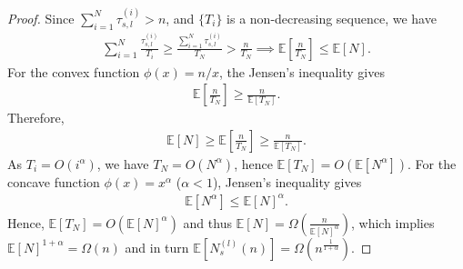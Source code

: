 \documentclass[twoside,11pt]{article}
\newcommand{\pow}[1]{^{(#1)}}%
\numberwithin{equation}{section}
\newcommand{\lp}{\left(}
\newcommand{\rp}{\right)}
\begin{document}
\begin{proof}
Since $\sum_{i=1}^N \tau_{s,l} \pow i > n$, and $\{T_i\}$ is a non-decreasing sequence, we have
\begin{align*}
\sum_{i=1}^N \frac{\tau_{s,l} \pow i}{T_i} \geq \frac{\sum_{i=1}^N \tau_{s,l} \pow i}{T_N} > \frac{n}{T_N} \implies \mathbb{E}\left[\frac{n}{T_N}\right] \leq \mathbb{E}[N].
\end{align*}
For the convex function $\phi(x) = n/x$, the Jensen's inequality gives
\begin{align*}
\mathbb{E}\left[\frac{n}{T_N}\right] \geq \frac{n}{\mathbb{E}[T_N]}.
\end{align*}
Therefore,
\begin{align*}
\mathbb{E}[N] \geq \mathbb{E}\left[\frac{n}{T_N}\right]    \geq \frac{n}{\mathbb{E}[T_N]}.
\end{align*}
As $T_i = O(i^\alpha)$, we have $T_N = O(N^\alpha)$, hence $\mathbb{E}[T_N] = O(\mathbb{E}[N^\alpha])$. 
For the concave function $\phi(x) = x^\alpha$ ($\alpha < 1$), Jensen's inequality gives
\begin{align*}
\mathbb{E}[N^\alpha] \leq \mathbb{E}[N]^\alpha.
\end{align*}
Hence, $\mathbb{E}[T_N] = O(\mathbb{E}[N]^\alpha)$ and thus
$
\mathbb{E}[N] = \Omega\lp \frac{n}{\mathbb{E}[N]^\alpha} \rp
$, 
which implies 
$\mathbb{E}[N]^{1+\alpha} = \Omega(n)$ and in turn $\mathbb{E}[N_s \pow l (n)] = \Omega\lp n^{\frac{1}{1+\alpha}}\rp.$
\end{proof}
\end{document}

